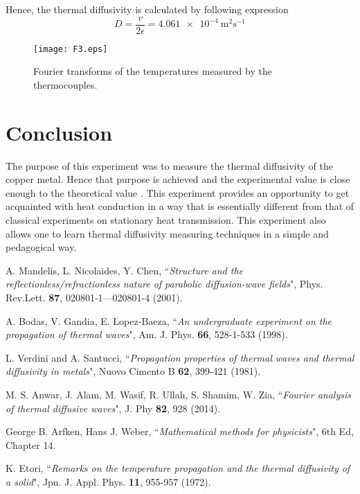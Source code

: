 \documentclass[12pt,a4]{article}
\begin{document}
Hence, the thermal diffusivity is calculated by following expression
\begin{equation}
D=\frac{v}{2\epsilon}= \SI{4.061e-4} {\meter^2\second^{-1}} 
\end{equation}


\begin{figure}[!ht]
\begin{center}
\texttt{[image: F3.eps]}\\
\caption{Fourier transforms of the temperatures measured by the thermocouples. } \label{fig4}
\end{center}
\end{figure}

\section{Conclusion}
The purpose of this experiment was to measure the thermal diffusivity of the copper metal. Hence that purpose is achieved and the experimental value is close enough to the theoretical value \cite{4}. This experiment provides an opportunity to get acquainted with heat conduction in a way that is essentially different from that of classical experiments on stationary heat transmission. This experiment also allows one to learn thermal diffusivity measuring techniques in a simple and pedagogical way.

\begin{thebibliography}{99}

 A. Mandelis, L. Nicolaides, Y. Chen, ``\emph{Structure and the reflectionless/refractionless nature of parabolic diffusion-wave fields}", Phys. Rev.Lett. \textbf{87}, 020801-1---020801-4 (2001).

 A. Bodas, V. Gandia, E. Lopez-Baeza, ``\emph{An undergraduate experiment on the propagation of thermal waves}", Am. J. Phys. \textbf{66}, 528-1-533 (1998).

 L. Verdini and A. Santucci, ``\emph{Propagation properties of thermal waves and
thermal diffusivity in metals}", Nuovo Cimento B \textbf{62}, 399-421 (1981).


 M. S. Anwar, J. Alam, M. Wasif, R. Ullah, S. Shamim, W. Zia, ``\emph{Fourier analysis of thermal diffusive waves}", J. Phy \textbf{82}, 928 (2014).

 George B. Arfken, Hans J. Weber, ``\emph{Mathematical methods for physicists}", 6th Ed, Chapter 14.

 K. Etori, ``\emph{Remarks on the temperature propagation and the thermal diffusivity of a solid}", Jpn. J. Appl. Phys. \textbf{11}, 955-957 (1972).


\end{thebibliography}
\end{document}
